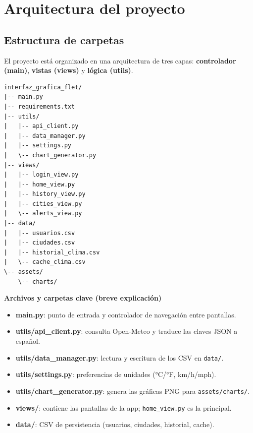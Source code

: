 \documentclass[12pt,a4paper]{article}
\begin{document}
\section{Arquitectura del proyecto}

\subsection{Estructura de carpetas}

El proyecto está organizado en una arquitectura de tres capas: \textbf{controlador (main)}, \textbf{vistas (views)} y \textbf{lógica (utils)}.

\begin{lstlisting}[frame=none, numbers=none, basicstyle=\ttfamily\footnotesize]
interfaz_grafica_flet/
|-- main.py
|-- requirements.txt
|-- utils/
|   |-- api_client.py
|   |-- data_manager.py
|   |-- settings.py
|   \-- chart_generator.py
|-- views/
|   |-- login_view.py
|   |-- home_view.py
|   |-- history_view.py
|   |-- cities_view.py
|   \-- alerts_view.py
|-- data/
|   |-- usuarios.csv
|   |-- ciudades.csv
|   |-- historial_clima.csv
|   \-- cache_clima.csv
\-- assets/
    \-- charts/
\end{lstlisting}

\noindent\textbf{Archivos y carpetas clave (breve explicación)}
\begin{itemize}
    \item \textbf{main.py}: punto de entrada y controlador de navegación entre pantallas.
    \item \textbf{utils/api\_client.py}: consulta Open-Meteo y traduce las claves JSON a español.
    \item \textbf{utils/data\_manager.py}: lectura y escritura de los CSV en \texttt{data/}.
    \item \textbf{utils/settings.py}: preferencias de unidades (°C/°F, km/h/mph).
    \item \textbf{utils/chart\_generator.py}: genera las gráficas PNG para \texttt{assets/charts/}.
    \item \textbf{views/}: contiene las pantallas de la app; \texttt{home\_view.py} es la principal.
    \item \textbf{data/}: CSV de persistencia (usuarios, ciudades, historial, cache).
\end{itemize}
\end{document}
